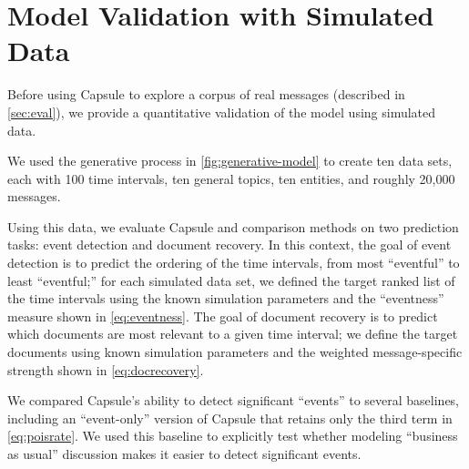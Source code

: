 
\section{Model Validation with Simulated Data}
\label{sec:valid}




Before using Capsule to explore a corpus of real messages (described
in \cref{sec:eval}), we provide a quantitative validation of the model
using simulated data.

We used the generative process in \cref{fig:generative-model} to
create ten data sets, each with 100 time intervals, ten general
topics, ten entities, and roughly 20,000 messages. 

Using this data, we evaluate Capsule and comparison methods on two prediction tasks: event detection and document recovery.  
In this context, the goal of event detection is to predict the ordering of the time intervals, from most ``eventful'' to least ``eventful;''
for each simulated data set, we defined the target ranked list of the time intervals using the known simulation parameters and the ``eventness'' measure shown in \cref{eq:eventness}.
The goal of document recovery is to predict which documents are most relevant to a given time interval; we define the target documents using known simulation parameters and the weighted message-specific strength shown in \cref{eq:docrecovery}.

We compared Capsule's ability to detect significant ``events'' 
to several baselines, including an ``event-only'' version of 
Capsule that retains only the third term in
\cref{eq:poisrate}.
We used this baseline to explicitly test whether
modeling ``business as usual'' discussion makes it easier to detect
significant events.

